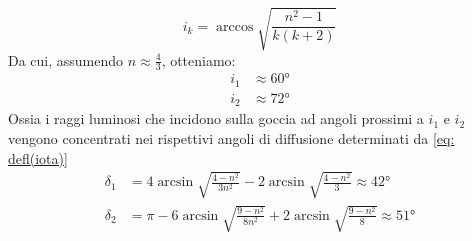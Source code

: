 \documentclass{report}[a4paper,11pt]
\begin{document}
\begin{equation}\label{eq:crit}
i_k = \arccos\sqrt{\frac{n^2-1}{k(k+2)}}
\end{equation}
Da cui, assumendo $n \approx \frac{4}{3}$, otteniamo:
\begin{align*}
i_1 &\approx 60 \si{\degree}\\
i_2 &\approx 72 \si{\degree}
\end{align*}
Ossia i raggi luminosi che incidono sulla goccia ad angoli prossimi a $i_1$ e $i_2$ vengono concentrati nei rispettivi angoli di diffusione determinati da \eqref{eq: defl(iota)}
\begin{align}
\delta_1 &= 4 \arcsin{\sqrt{\frac{4 - n^2}{3n^2}}} -2 \arcsin{\sqrt{\frac{4 - n^2}{3}}} \approx 42 \si{\degree}\\
\delta_2 &= \pi -6 \arcsin{\sqrt{\frac{9 - n^2}{8n^2}}} + 2\arcsin{\sqrt{\frac{9 - n^2}{8}}} \approx 51 \si{\degree}
\end{align}
\end{document}
